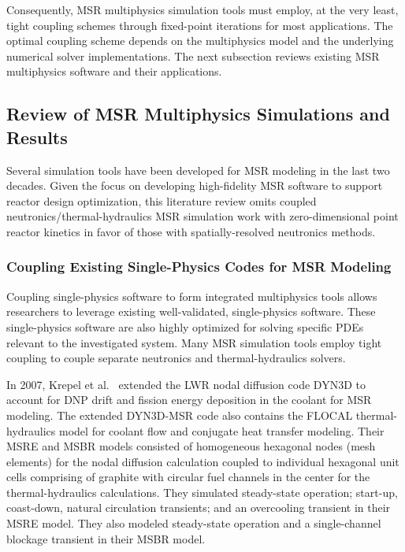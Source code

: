 Consequently, MSR multiphysics simulation tools must employ, at the very least, tight coupling
schemes through fixed-point iterations for most applications. The optimal coupling scheme depends
on the multiphysics model and the underlying numerical solver implementations.
The next subsection reviews existing \gls{MSR} multiphysics software and their applications.

\subsection{Review of MSR Multiphysics Simulations and Results} \label{sec:msr-tools}

Several simulation tools have been developed for \gls{MSR} modeling in the last two decades. Given
the focus on developing high-fidelity \gls{MSR} software to support reactor design optimization,
this literature review omits coupled neutronics/thermal-hydraulics MSR simulation work with
zero-dimensional point reactor kinetics in favor of those with spatially-resolved neutronics
methods.

\subsubsection{Coupling Existing Single-Physics Codes for MSR Modeling}

Coupling single-physics software to form integrated multiphysics tools allows researchers to
leverage existing well-validated, single-physics software. These single-physics software are also
highly optimized for solving specific \glspl{PDE} relevant to the investigated system.
Many \gls{MSR} simulation tools employ tight coupling to couple separate neutronics and
thermal-hydraulics solvers.

In 2007, Krepel et al.\ \cite{krepel_dyn3d-msr_2007} extended the
\gls{LWR} nodal diffusion code DYN3D to account for \gls{DNP} drift and fission energy deposition
in the coolant for \gls{MSR} modeling. The extended DYN3D-MSR code also contains the FLOCAL
thermal-hydraulics model for coolant flow and conjugate heat transfer modeling. Their \gls{MSRE}
and \gls{MSBR} models consisted of homogeneous hexagonal nodes (mesh elements) for the nodal
diffusion calculation coupled to individual hexagonal unit cells comprising of graphite with
circular fuel channels in the center for the thermal-hydraulics calculations. They simulated
steady-state operation; start-up, coast-down, natural circulation transients; and an overcooling
transient in their \gls{MSRE} model. They also modeled steady-state operation and a single-channel
blockage transient in their \gls{MSBR} model.

